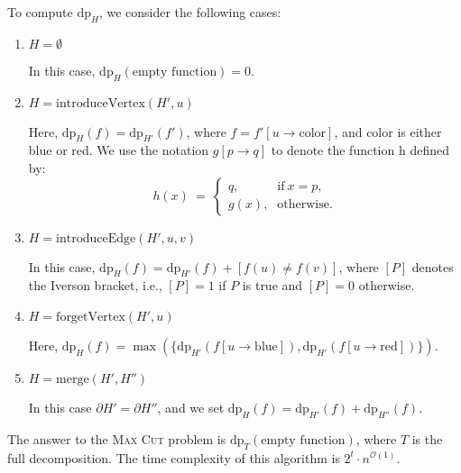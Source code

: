 \documentclass[12pt]{article}
\begin{document}
	\medskip
	
	To compute \(\text{dp}_{H}\), we consider the following cases:
	\begin{enumerate}
		\item \(H = \emptyset\)
		      
		      In this case, \(\text{dp}_{H}(\text{empty function}) = 0\).
		
		\item \(H = \text{introduceVertex}(H', u)\)
		      
		      Here, \(\text{dp}_{H}(f) = \text{dp}_{H'}(f')\), where \(f =
		      f'[u \to \text{color}]\), and color is either blue or red. We use
		      the notation \(g[p \to q]\) to denote the function h defined by:
		      \[ h(x) \ = \ \begin{cases} q \text{,} & \text{if} \ x = p
		      \text{,} \\
		      g(x) \text{,} & \text{otherwise.} \end{cases} \]
		
		\item \(H = \text{introduceEdge}(H', u, v)\)
		      
		      In this case, \(\text{dp}_{H}(f) = \text{dp}_{H'}(f) + [f(u) \neq
		      f(v)]\), where \([P]\) denotes the Iverson bracket, i.e., \([P] =
		      1\) if \(P\) is true and \([P] = 0\) otherwise.
		
		\item \(H = \text{forgetVertex}(H', u)\)
		      
		      Here, \(\text{dp}_{H}(f) = \max(\{
		      \text{dp}_{H'}(f[u \to \text{blue}]),
		      \text{dp}_{H'}(f[u \to \text{red}])\})\).
		
		\item \(H = \text{merge}(H', H'')\)
		      
		      In this case \(\partial H' = \partial H''\), and we set
		      \(\text{dp}_{H}(f) = \text{dp}_{H'}(f) + \text{dp}_{H''}(f)\).
	\end{enumerate}
	The answer to the \textsc{Max Cut} problem is
	\(\text{dp}_{T}(\text{empty function})\), where \(T\) is the full
	decomposition. The time complexity of this algorithm is \(2^{t} \cdot
	n^{\mathcal{O}(1)}\).
\end{document}
